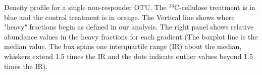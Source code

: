 Density profile for a single non-responder OTU. The $^{13}$C-cellulose treatment is in
blue and the control treatment is in orange. The Vertical line shows
where "heavy" fractions begin as defined in our analysis. The right panel
shows relative abundance values in the heavy fractions for each gradient
(The boxplot line is the median value. The box spans one interquartile
range (IR) about the median, whiskers extend 1.5 times the IR and the dots
indicate outlier values beyond 1.5 times the IR).

